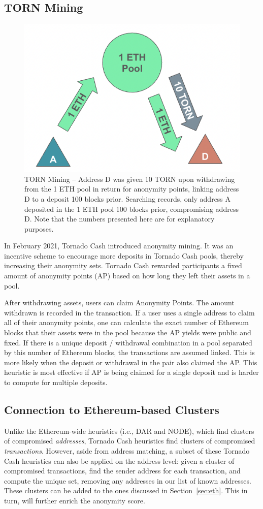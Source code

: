 \subsection{TORN Mining}

\begin{figure}[h!]
\centering
\includegraphics[width=0.6\linewidth]{figures/tcash/h5.png}
\caption{TORN Mining -- Address D was given 10 TORN upon withdrawing from the 1 ETH pool in return for anonymity points, linking address D to a deposit 100 blocks prior. Searching  records, only address A deposited in the 1 ETH pool 100 blocks prior, compromising address D. Note that the numbers presented here are for explanatory purposes.}
\label{fig:tornado}
\end{figure}

In February 2021, Tornado Cash introduced anonymity mining. It was an incentive scheme to encourage more deposits in Tornado Cash pools, thereby increasing their anonymity sets. Tornado Cash rewarded participants a fixed amount of anonymity points (AP) based on how long they left their assets in a pool.

After withdrawing assets, users can claim Anonymity Points. The amount withdrawn is recorded in the transaction. If a user uses a single address to claim all of their anonymity points, one can calculate the exact number of Ethereum blocks that their assets were in the pool because the AP yields were public and fixed. If there is a unique deposit / withdrawal combination in a pool separated by this number of Ethereum blocks, the transactions are assumed linked. This is more likely when the deposit or withdrawal in the pair also claimed the AP. This heuristic is most effective if AP is being claimed for a single deposit and is harder to compute for multiple deposits. 

\subsection{Connection to Ethereum-based Clusters}

Unlike the Ethereum-wide heuristics (i.e., DAR and NODE), which find clusters of compromised \textit{addresses}, Tornado Cash heuristics find clusters of compromised \textit{transactions}. However, aside from address matching, a subset of these Tornado Cash heuristics can also be applied on the address level: given a cluster of compromised transactions, find the sender address for each transaction, and compute the unique set, removing any addresses in our list of known addresses. These clusters can be added to the ones discussed in Section~\ref{sec:eth}. This in turn, will further enrich the anonymity score.